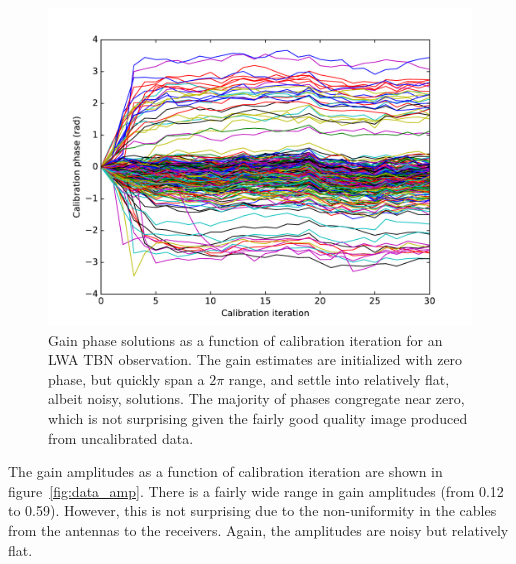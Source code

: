 \documentclass[a4paper,fleqn,usenatbib]{mnras}
\begin{document}
\begin{figure}
\begin{center}
\includegraphics[width=\columnwidth]{fig6.pdf}
\caption{Gain phase solutions as a function of calibration iteration for an LWA TBN observation. 
The gain estimates are initialized with zero phase, but quickly span a $2\pi$ range, and settle 
into relatively flat, albeit noisy, solutions. The majority of phases congregate near zero, which is 
not surprising given the fairly good quality image produced from uncalibrated data.
}
\label{fig:data_phase}
\end{center}
\end{figure}

The gain amplitudes as a function of calibration iteration are shown in 
figure~\ref{fig:data_amp}. There is a fairly wide range in gain amplitudes (from 0.12 to 0.59). 
However, this is not surprising due to the non-uniformity in the cables from the antennas to the 
receivers. Again, the amplitudes are noisy but relatively flat.
\end{document}
